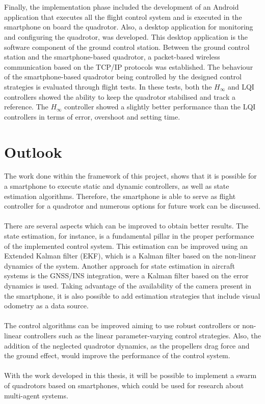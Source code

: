 \\\\
Finally, the implementation phase included the development of an Android application that executes all the flight control system and is executed in the smartphone on board the quadrotor. Also, a desktop application for monitoring and configuring the quadrotor, was developed. This desktop application is the software component of the ground control station. Between the ground control station and the smartphone-based quadrotor, a packet-based wireless communication based on the TCP/IP protocols was established. The behaviour of the smartphone-based quadrotor being controlled by the designed control strategies is evaluated through flight tests. In these tests, both the $H_\infty$ and LQI controllers showed the ability to keep the quadrotor stabilised and track a reference. The $H_\infty$ controller showed a slightly better performance than the LQI controllers in terms of error, overshoot and setting time.


\section{Outlook}
The work done within the framework of this project, shows that it is possible for a smartphone to execute static and dynamic controllers, as well as state estimation algorithms. Therefore, the smartphone is able to serve as flight controller for a quadrotor and numerous options for future work can be discussed.
\\\\
There are several aspects which can be improved to obtain better results. The state estimation, for instance, is a fundamental pillar in the proper performance of the implemented control system. This estimation can be improved using an Extended Kalman filter (EKF), which is a Kalman filter based on the non-linear dynamics of the system. Another approach for state estimation in aircraft systems is the GNSS/INS integration, were a Kalman filter based on the error dynamics is used. Taking advantage of the availability of the camera present in the smartphone, it is also possible to add estimation strategies that include visual odometry as a data source.
\\\\
The control algorithms can be improved aiming to use robust controllers or non-linear controllers such as the linear parameter-varying control strategies. Also, the addition of the neglected quadrotor dynamics, as the propellers drag force and the ground effect, would improve the performance of the control system.
\\\\
With the work developed in this thesis, it will be possible to implement a swarm of quadrotors based on smartphones, which could be used for research about multi-agent systems.